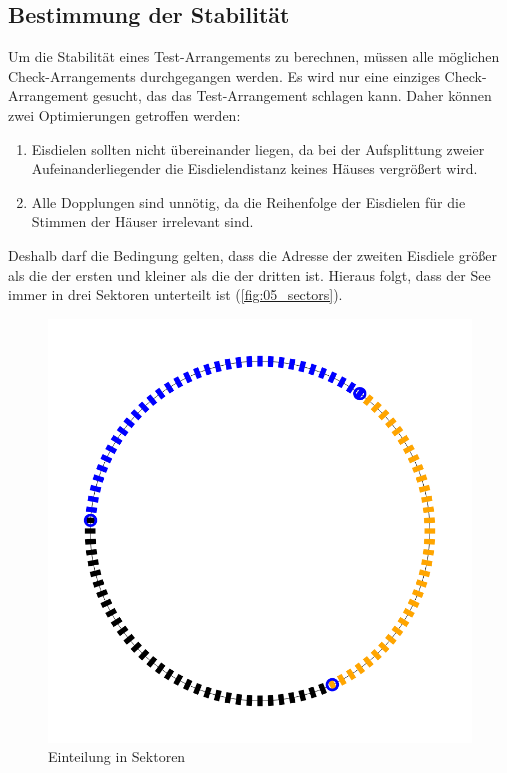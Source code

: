 \documentclass[a4paper,10pt,ngerman,captions=figureheading]{scrartcl}
\newcommand{\imageWidth}{0.3\linewidth}
\begin{document}
\subsection{Bestimmung der Stabilität}
\label{sec:Bestimmung_der_Stabilität}
Um die Stabilität eines Test-Arrangements zu berechnen, müssen alle möglichen Check-Arrangements durchgegangen werden.
Es wird nur eine einziges Check-Arrangement gesucht, das das Test-Arrangement schlagen kann.
Daher können zwei Optimierungen getroffen werden:
\begin{enumerate}
    \item Eisdielen sollten nicht übereinander liegen, da bei der Aufsplittung zweier Aufeinanderliegender die Eisdielendistanz keines Häuses vergrößert wird.
    \item Alle Dopplungen sind unnötig, da die Reihenfolge der Eisdielen für die Stimmen der Häuser irrelevant sind.
\end{enumerate}
Deshalb darf die Bedingung gelten, dass die Adresse der zweiten Eisdiele größer als die der ersten und kleiner als die der dritten ist.
Hieraus folgt, dass der See immer in drei Sektoren unterteilt ist (\autoref{fig:05_sectors}).

\begin{figure}[ht]
    \centering
    \caption{Einteilung in Sektoren}
    \label{fig:05_sectors}
    \includegraphics[width=\imageWidth]{05_sectors.png}
\end{figure}
\end{document}
